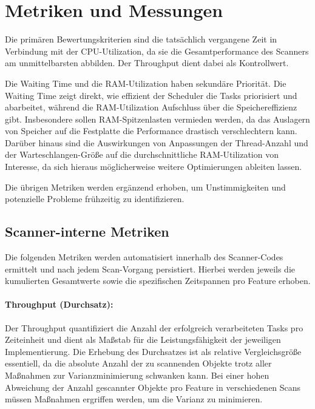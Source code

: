 \begin{sloppypar}
\section{Metriken und Messungen}
Die primären Bewertungskriterien sind die tatsächlich vergangene Zeit in Verbindung mit der \acs{CPU}-Utilization,
da sie die Gesamtperformance des Scanners am unmittelbarsten abbilden.
Der Throughput dient dabei als Kontrollwert.

\vspace{7.56mm}

\noindent Die Waiting Time und die \acs{RAM}-Utilization haben sekundäre Priorität.
Die Waiting Time zeigt direkt, wie effizient der Scheduler die Tasks priorisiert und abarbeitet,
während die \acs{RAM}-Utilization Aufschluss über die Speichereffizienz gibt.
Insbesondere sollen \acs{RAM}-Spitzenlasten vermieden werden, 
da das Auslagern von Speicher auf die Festplatte die Performance drastisch verschlechtern kann.
Darüber hinaus sind die Auswirkungen von Anpassungen der Thread-Anzahl und der Warteschlangen-Größe
auf die durchschnittliche \acs{RAM}-Utilization von Interesse,
da sich hieraus möglicherweise weitere Optimierungen ableiten lassen.

\vspace{7.56mm}

\noindent Die übrigen Metriken werden ergänzend erhoben, um Unstimmigkeiten und potenzielle Probleme frühzeitig zu identifizieren.

\subsection{Scanner-interne Metriken}
Die folgenden Metriken werden automatisiert innerhalb des Scanner-Codes ermittelt
und nach jedem Scan-Vorgang persistiert.
Hierbei werden jeweils die kumulierten Gesamtwerte sowie die spezifischen Zeitspannen pro Feature erhoben.

\paragraph{Throughput (Durchsatz):}
Der Throughput quantifiziert die Anzahl der erfolgreich verarbeiteten Tasks pro Zeiteinheit
und dient als Maßstab für die Leistungsfähigkeit der jeweiligen Implementierung.
Die Erhebung des Durchsatzes ist als relative Vergleichsgröße essentiell,
da die absolute Anzahl der zu scannenden Objekte trotz aller Maßnahmen zur Varianzminimierung schwanken kann.
Bei einer hohen Abweichung der Anzahl gescannter Objekte pro Feature in verschiedenen Scans
müssen Maßnahmen ergriffen werden, um die Varianz zu minimieren.


\end{sloppypar}
